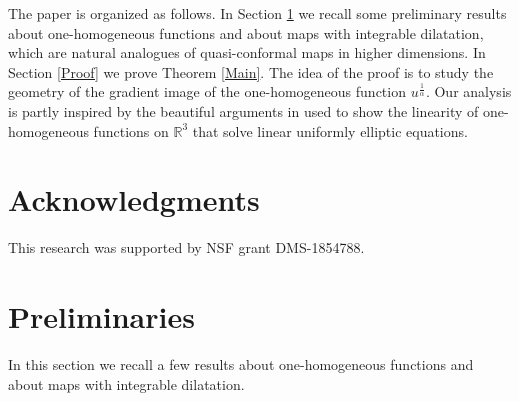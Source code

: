 \documentclass{amsart}
\theoremstyle{definition}
\theoremstyle{remark}
\begin{document}
The paper is organized as follows. In Section \ref{Preliminaries} we recall some preliminary results about one-homogeneous functions and about maps with integrable dilatation, which are natural analogues of quasi-conformal maps in higher dimensions. In Section \ref{Proof} we prove Theorem \ref{Main}. The idea of the proof is to study the geometry of the gradient image of the one-homogeneous function $u^{\frac{1}{\alpha}}$. Our analysis is partly inspired by the beautiful arguments in \cite{HNY} used to show the linearity of one-homogeneous functions on $\mathbb{R}^3$ that solve linear uniformly elliptic equations.

\section*{Acknowledgments}

This research was supported by NSF grant DMS-1854788.

\section{Preliminaries}\label{Preliminaries}

In this section we recall a few results about one-homogeneous functions and about maps with integrable dilatation.

\vspace{2mm}
\end{document}
